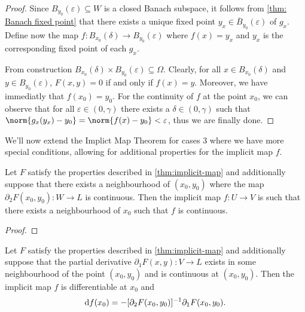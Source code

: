 \begin{proof}
  Since \(B_{y_0}(\varepsilon) \subseteq W\) is a closed Banach subspace, it follows from
  \cref{thm: Banach fixed point} that there exists a unique fixed point \(y_x
  \in \overline{B}_{y_0}(\varepsilon)\) of \(g_{x}\). Define now the map \(f: B_{x_0}(\delta) \to
  B_{y_0}(\varepsilon)\) where \(f(x) = y_{x}\) and \(y_x\) is the corresponding fixed
  point of each \(g_x\).

  From construction \(B_{x_0}(\delta) \times B_{y_0}(\varepsilon) \subseteq \Omega\). Clearly, for all \(x \in
  B_{x_0}(\delta)\) and \(y \in B_{y_0}(\varepsilon)\), \(F(x, y) = 0\) if and only if \(f(x) =
  y\). Moreover, we have immediatly that \(f(x_0) = y_0\). For the continuity of
  \(f\) at the point \(x_0\), we can observe that for all \(\varepsilon \in (0, \gamma)\) there
  exists a \(\delta \in (0, \gamma)\) such that \(\norm{g_x(y_x) - y_0} = \norm{f(x) - y_0}
  < \varepsilon\), thus we are finally done.
\end{proof}

We'll now extend the Implict Map Theorem for cases 3 where we have more
special conditions, allowing for additional properties for the implicit map
\(f\).

\begin{lemma}
  \label{lem:continuity-implicit-map}
  Let \(F\) satisfy the properties described in \cref{thm:implicit-map} and
  additionally suppose that there exists a neighbourhood of \((x_0, y_0)\) where
  the map \(\partial_2F(x_0, y_0): W \to L\) is continuous. Then the implicit map \(f: U
  \to V\) is such that there exists a neighbourhood of \(x_0\) such that \(f\) is
  continuous.
\end{lemma}

\begin{proof}

\end{proof}


\begin{lemma}
  \label{lem:differential-implicit-map}
  Let \(F\) satisfy the properties described in \cref{thm:implicit-map} and
  additionally suppose that the partial derivative \(\partial_1F(x, y): V \to L\)
  exists in some neighbourhood of the point \((x_0, y_0)\) and is continuous at
  \((x_0, y_0)\). Then the implicit map \(f\) is differentiable at \(x_0\) and
  \[
    \mathrm{d} f(x_0) = - [\partial_2F(x_0, y_0)]^{-1} \partial_1 F(x_{0}, y_0).
  \]
\end{lemma}


